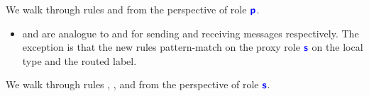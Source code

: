 \begin{figure}[!h]
\begin{prooftree}
\end{prooftree}

\begin{prooftree}
\end{prooftree}

\label{fig:newlocal}
\end{figure}

We walk through rules  and 
from the perspective of role $\role{p}$.

\begin{itemize}

\item {} and  are
analogue to  and 
for sending and receiving messages respectively.
The exception is that the new rules pattern-match
on the proxy role $\role{s}$ on the local type
and the routed label.

\end{itemize}

We walk through rules , ,
 and 
from the perspective of role $\role{s}$.

